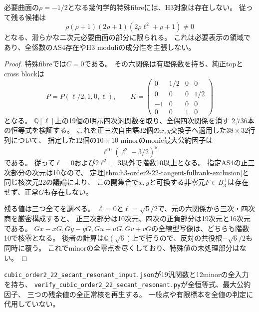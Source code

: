 \begin{theorem}[共鳴特殊fibreの全値排除]
\label{thm:h3-order2-22-secant-resonant-exclusion}
必要曲面の$\rho=-1/2$となる幾何学的特殊fibreには、H3対象は存在しない。
従って残る候補は
\[
 \rho(\rho+1)(2\rho+1)(2\rho\ell^2+\rho+1)\ne0
\]
となる、滑らかな二次元必要曲面の部分に限られる。
これは必要表示の領域であり、全係数のAS4存在やH3 moduliの成分性を主張しない。
\end{theorem}
\begin{proof}
特殊fibreでは$C=0$である。
その六関係は有理係数を持ち、純正topとcross blockは
\[
 P=P(\ell/2,1,0,\ell),\qquad
 K=\begin{pmatrix}0&1/2&0&0\\0&0&0&1/2\\-1&0&0&0\\0&0&1&0\end{pmatrix}
\]
となる。
$\mathbb Q[\ell]$上の19個の明示四次汎関数を取り、全偶四次関係を消す
2,736本の恒等式を検証する。
これを正三次自由語32個の$x,y$交換子へ適用した$38\times32$行列について、
指定した12個の$10\times10$ minorのmonic最大公約因子は
\[
 \ell^{10}(\ell^2-3/2)^5
\]
である。
従って$\ell=0$および$2\ell^2=3$以外で階数10以上となる。
指定AS4の正三次部分の次元は10なので、
定理\ref{thm:h3-order2-22-tangent-fullrank-exclusion}と同じ核次元22の議論により、
この開集合で$x,y$と可換する非零元$F\in B_3^+$は存在せず、正常$G$も存在しない。

残る値は三つ全てを調べる。
$\ell=0$と$\ell=\sqrt6/2$で、元の六関係から三次・四次商を厳密構成すると、
正三次部分は10次元、四次の正負部分は19次元と16次元である。
$Gx-xG,Gy-yG,Gu+uG,Gv+vG$の全線型写像は、どちらも階数10で核零となる。
後者の計算は$\mathbb Q(\sqrt6)$上で行うので、反対の共役根$-\sqrt6/2$も同時に覆う。
これでminorの全零点を尽くしており、特殊値の未処理部分はない。
\end{proof}

\texttt{cubic\_order2\_22\_secant\_resonant\_input.json}が19汎関数と12minorの全入力を持ち、
\texttt{verify\_cubic\_order2\_22\_secant\_resonant.py}が全恒等式、最大公約因子、
三つの残余値の全正常核を再生する。
一般点や有限標本を全値の判定に代用していない。

